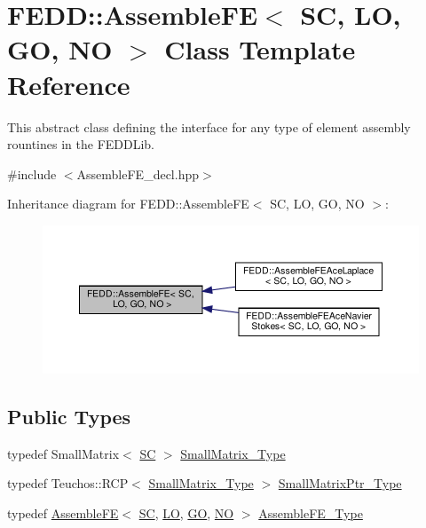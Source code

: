 \hypertarget{classFEDD_1_1AssembleFE}{}\section{F\+E\+DD\+:\+:Assemble\+FE$<$ SC, LO, GO, NO $>$ Class Template Reference}
\label{classFEDD_1_1AssembleFE}


This abstract class defining the interface for any type of element assembly rountines in the F\+E\+D\+D\+Lib.  




{\ttfamily \#include $<$Assemble\+F\+E\+\_\+decl.\+hpp$>$}



Inheritance diagram for F\+E\+DD\+:\+:Assemble\+FE$<$ SC, LO, GO, NO $>$\+:
\nopagebreak
\begin{figure}[H]
\begin{center}
\leavevmode
\includegraphics[width=350pt]{classFEDD_1_1AssembleFE__inherit__graph}
\end{center}
\end{figure}
\subsection*{Public Types}
\begin{DoxyCompactItemize}
\item 
typedef Small\+Matrix$<$ \hyperlink{fe__test__laplace_8cpp_a79c7e86a57edbb2a5a53242bcd04e41e}{SC} $>$ \hyperlink{classFEDD_1_1AssembleFE_a8b8c588ba0cfaa200a74215f19e62722}{Small\+Matrix\+\_\+\+Type}
\item 
typedef Teuchos\+::\+R\+CP$<$ \hyperlink{classFEDD_1_1AssembleFE_a8b8c588ba0cfaa200a74215f19e62722}{Small\+Matrix\+\_\+\+Type} $>$ \hyperlink{classFEDD_1_1AssembleFE_afb5fb5dca3aab59f697a25884e99e894}{Small\+Matrix\+Ptr\+\_\+\+Type}
\item 
typedef \hyperlink{classFEDD_1_1AssembleFE}{Assemble\+FE}$<$ \hyperlink{fe__test__laplace_8cpp_a79c7e86a57edbb2a5a53242bcd04e41e}{SC}, \hyperlink{fe__test__laplace_8cpp_ad6a38c9f07d3fd633eefca5bccad8410}{LO}, \hyperlink{fe__test__laplace_8cpp_afa2946b509009b4f45eb04bd8c5b27d9}{GO}, \hyperlink{fe__test__laplace_8cpp_a5e24f37b28787429872b6ecb1d0417ce}{NO} $>$ \hyperlink{classFEDD_1_1AssembleFE_ab2c8bb1fd65dfcf7899a7c4a4a8a4021}{Assemble\+F\+E\+\_\+\+Type}
\end{DoxyCompactItemize}
